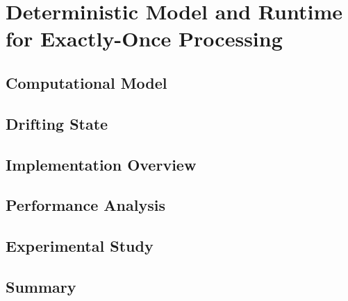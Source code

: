 \chapter{Deterministic Model and Runtime for Exactly-Once Processing}

\section{Computational Model}

\section{Drifting State}

\section{Implementation Overview}

\section{Performance Analysis}

\section{Experimental Study}

\section{Summary}